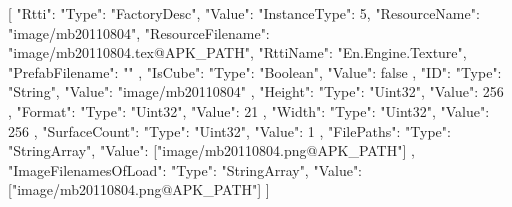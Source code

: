 [{
        "Rtti": {
            "Type": "FactoryDesc",
            "Value": {
                "InstanceType": 5,
                "ResourceName": "image/mb20110804",
                "ResourceFilename": "image/mb20110804.tex@APK_PATH",
                "RttiName": "En.Engine.Texture",
                "PrefabFilename": ""
            }
        },
        "IsCube": {
            "Type": "Boolean",
            "Value": false
        },
        "ID": {
            "Type": "String",
            "Value": "image/mb20110804"
        },
        "Height": {
            "Type": "Uint32",
            "Value": 256
        },
        "Format": {
            "Type": "Uint32",
            "Value": 21
        },
        "Width": {
            "Type": "Uint32",
            "Value": 256
        },
        "SurfaceCount": {
            "Type": "Uint32",
            "Value": 1
        },
        "FilePaths": {
            "Type": "StringArray",
            "Value": ["image/mb20110804.png@APK_PATH"]
        },
        "ImageFilenamesOfLoad": {
            "Type": "StringArray",
            "Value": ["image/mb20110804.png@APK_PATH"]
        }
    }]